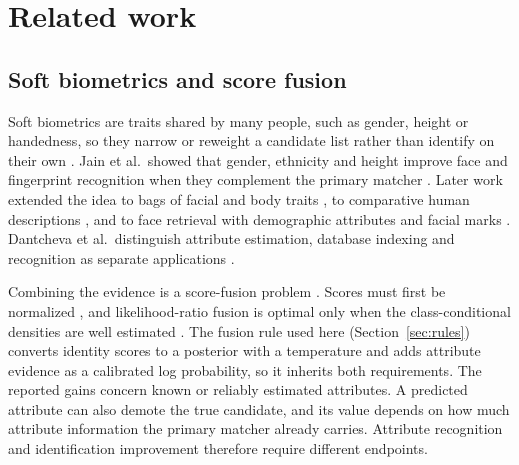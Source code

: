 \documentclass[ASNA,twocolumn]{USG}
\begin{document}
\section{Related work}
\label{sec:related}
\subsection{Soft biometrics and score fusion}
Soft biometrics are traits shared by many people, such as gender, height or handedness, so they narrow or reweight a candidate list rather than identify on their own \cite{jain2004soft,dantcheva2016soft,nixon2015soft}. Jain et al.\ showed that gender, ethnicity and height improve face and fingerprint recognition when they complement the primary matcher \cite{jain2004integrating}. Later work extended the idea to bags of facial and body traits \cite{dantcheva2011bag}, to comparative human descriptions \cite{reid2014comparative}, and to face retrieval with demographic attributes and facial marks \cite{park2010soft}. Dantcheva et al.\ distinguish attribute estimation, database indexing and recognition as separate applications \cite{dantcheva2016soft}.

Combining the evidence is a score-fusion problem \cite{kittler1998combining,ross2003fusion}. Scores must first be normalized \cite{jain2005normalization}, and likelihood-ratio fusion is optimal only when the class-conditional densities are well estimated \cite{nandakumar2008likelihood}. The fusion rule used here (Section~\ref{sec:rules}) converts identity scores to a posterior with a temperature and adds attribute evidence as a calibrated log probability, so it inherits both requirements. The reported gains concern known or reliably estimated attributes. A predicted attribute can also demote the true candidate, and its value depends on how much attribute information the primary matcher already carries. Attribute recognition and identification improvement therefore require different endpoints.
\end{document}
